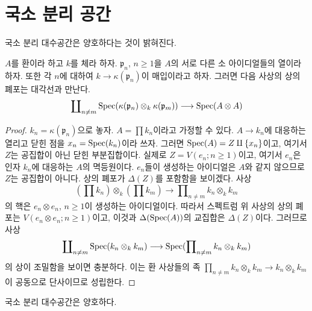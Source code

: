 \section{국소 분리 공간}
\label{section-locally-separated}

\noindent
국소 분리 대수공간은 양호하다는 것이 밝혀진다.

\begin{lemma}
\label{lemma-infinite-number}
$A$를 환이라 하고 $k$를 체라 하자. $\mathfrak p_n$, $n \geq 1$을
$A$의 서로 다른 소 아이디얼들의 열이라 하자. 또한 각 $n$에 대하여
$k \to \kappa(\mathfrak p_n)$이 매입이라고 하자. 그러면 다음 사상의
상의 폐포는 대각선과 만난다.
$$
\coprod\nolimits_{n \not = m}
\mathop{\mathrm{Spec}}(\kappa(\mathfrak p_n) \otimes_k \kappa(\mathfrak p_m))
\longrightarrow
\mathop{\mathrm{Spec}}(A \otimes A)
$$
\end{lemma}

\begin{proof}
$k_n = \kappa(\mathfrak p_n)$으로 놓자. $A = \prod k_n$이라고 가정할
수 있다. $A \to k_n$에 대응하는 열리고 닫힌 점을
$x_n = \mathop{\mathrm{Spec}}(k_n)$이라 쓰자.
그러면 $\mathop{\mathrm{Spec}}(A) = Z \amalg \{x_n\}$이고, 여기서 $Z$는 공집합이 아닌
닫힌 부분집합이다. 실제로 $Z = V(e_n; n \geq 1)$이고, 여기서 $e_n$은
인자 $k_n$에 대응하는 $A$의 멱등원이다. $e_n$들이 생성하는 아이디얼은
$A$와 같지 않으므로 $Z$는 공집합이 아니다. 상의 폐포가
$\Delta(Z)$를 포함함을 보이겠다. 사상
$$
(\prod k_n) \otimes_k (\prod k_m)
\longrightarrow
\prod\nolimits_{n \not = m} k_n \otimes_k k_m
$$
의 핵은 $e_n \otimes e_n$, $n \geq 1$이 생성하는 아이디얼이다.
따라서 스펙트럼 위 사상의 상의 폐포는
$V(e_n \otimes e_n; n \geq 1)$이고, 이것과
$\Delta(\mathop{\mathrm{Spec}}(A))$의 교집합은 $\Delta(Z)$이다. 그러므로 사상
$$
\coprod\nolimits_{n \not = m} \mathop{\mathrm{Spec}}(k_n \otimes_k k_m)
\longrightarrow
\mathop{\mathrm{Spec}}(\prod\nolimits_{n \not = m} k_n \otimes_k k_m)
$$
의 상이 조밀함을 보이면 충분하다. 이는 환 사상들의 족
$\prod_{n \not = m} k_n \otimes_k k_m \to k_n \otimes_k k_m$이
공동으로 단사이므로 성립한다.
\end{proof}

\begin{lemma}
\label{lemma-locally-separated-decent}
국소 분리 대수공간은 양호하다.
\end{lemma}

